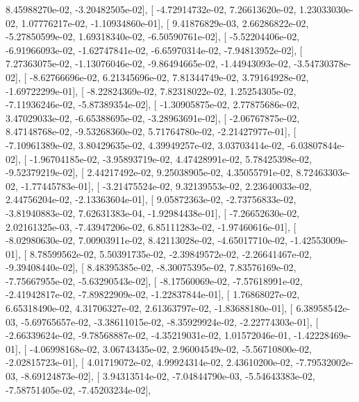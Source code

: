 \documentclass{article}
\begin{document}
          8.45988270e-02,  -3.20482505e-02],
       [ -4.72914732e-02,   7.26613620e-02,   1.23033030e-02,
          1.07776217e-02,  -1.10934860e-01],
       [  9.41876829e-03,   2.66286822e-02,  -5.27850599e-02,
          1.69318340e-02,  -6.50590761e-02],
       [ -5.52204406e-02,  -6.91966093e-02,  -1.62747841e-02,
         -6.65970314e-02,  -7.94813952e-02],
       [  7.27363075e-02,  -1.13076046e-02,  -9.86494665e-02,
         -1.44943093e-02,  -3.54730378e-02],
       [ -8.62766696e-02,   6.21345696e-02,   7.81344749e-02,
          3.79164928e-02,  -1.69722299e-01],
       [ -8.22824369e-02,   7.82318022e-02,   1.25254305e-02,
         -7.11936246e-02,  -5.87389354e-02],
       [ -1.30905875e-02,   2.77875686e-02,   3.47029033e-02,
         -6.65388695e-02,  -3.28963691e-02],
       [ -2.06767875e-02,   8.47148768e-02,  -9.53268360e-02,
          5.71764780e-02,  -2.21427977e-01],
       [ -7.10961389e-02,   3.80429635e-02,   4.39949257e-02,
          3.03703414e-02,  -6.03807844e-02],
       [ -1.96704185e-02,  -3.95893719e-02,   4.47428991e-02,
          5.78425398e-02,  -9.52379219e-02],
       [  2.44217492e-02,   9.25038905e-02,   4.35055791e-02,
          8.72463303e-02,  -1.77445783e-01],
       [ -3.21475524e-02,   9.32139553e-02,   2.23640033e-02,
          2.44756204e-02,  -2.13363604e-01],
       [  9.05872363e-02,  -2.73756833e-02,  -3.81940883e-02,
          7.62631383e-04,  -1.92984438e-01],
       [ -7.26652630e-02,   2.02161325e-03,  -7.43947206e-02,
          6.85111283e-02,  -1.97460616e-01],
       [ -8.02980630e-02,   7.00903911e-02,   8.42113028e-02,
         -4.65017710e-02,  -1.42553009e-01],
       [  8.78599562e-02,   5.50391735e-02,  -2.39849572e-02,
         -2.26641467e-02,  -9.39408440e-02],
       [  8.48395385e-02,  -8.30075395e-02,   7.83576169e-02,
         -7.75667955e-02,  -5.63290543e-02],
       [ -8.17560069e-02,  -7.57618991e-02,  -2.41942817e-02,
         -7.89822909e-02,  -1.22837844e-01],
       [  1.76868027e-02,   6.65318490e-02,   4.31706327e-02,
          2.61363797e-02,  -1.83688180e-01],
       [  6.38958542e-03,  -5.69765657e-02,  -3.38611015e-02,
         -8.35929924e-02,  -2.22774303e-01],
       [ -2.66339624e-02,  -9.78568887e-02,  -4.35219031e-02,
          1.01572046e-01,  -1.42228469e-01],
       [ -4.06998168e-02,   3.06743435e-02,   2.96004549e-02,
         -5.56710800e-02,  -2.02815723e-01],
       [  4.01719072e-02,   4.99924314e-02,   2.43610200e-02,
         -7.79532002e-03,  -8.69124873e-02],
       [  3.94313514e-02,  -7.04844790e-03,  -5.54643383e-02,
         -7.58751405e-02,  -7.45203234e-02],
\end{document}
